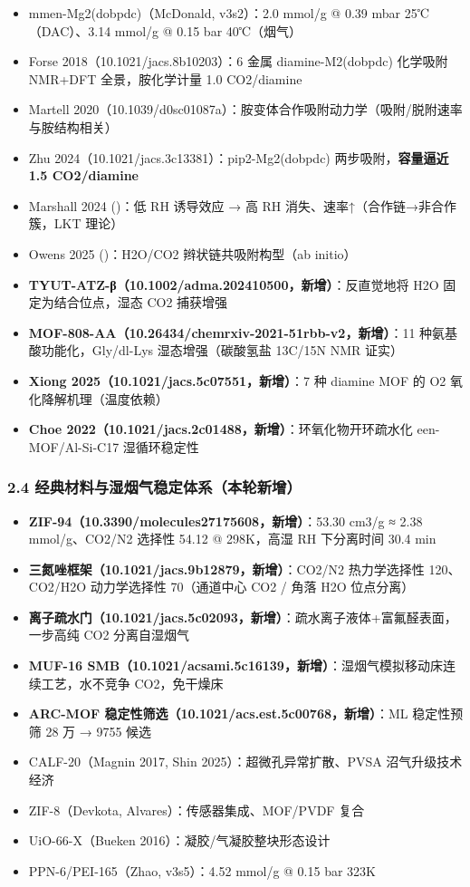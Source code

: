 \documentclass[12pt,a4paper]{ctexart}
\providecommand{\tightlist}{%
  \setlength{\itemsep}{0pt}\setlength{\parskip}{0pt}}
\begin{document}
\begin{itemize}
\tightlist
\item
  mmen-Mg2(dobpdc)（McDonald, v3s2）：2.0 mmol/g @ 0.39 mbar 25℃（DAC）、3.14 mmol/g @ 0.15 bar 40℃（烟气）
\item
  Forse 2018（10.1021/jacs.8b10203）：6 金属 diamine-M2(dobpdc) 化学吸附 NMR+DFT 全景，胺化学计量 1.0 CO2/diamine
\item
  Martell 2020（10.1039/d0sc01087a）：胺变体合作吸附动力学（吸附/脱附速率与胺结构相关）
\item
  Zhu 2024（10.1021/jacs.3c13381）：pip2-Mg2(dobpdc) 两步吸附，\textbf{容量逼近 1.5 CO2/diamine}
\item
  Marshall 2024 (\cite{p35})：低 RH 诱导效应 → 高 RH 消失、速率↑（合作链→非合作簇，LKT 理论）
\item
  Owens 2025 (\cite{p24})：H2O/CO2 辫状链共吸附构型（ab initio）
\item
  \textbf{TYUT-ATZ-β（10.1002/adma.202410500，新增）}：反直觉地将 H2O 固定为结合位点，湿态 CO2 捕获增强
\item
  \textbf{MOF-808-AA（10.26434/chemrxiv-2021-51rbb-v2，新增）}：11 种氨基酸功能化，Gly/dl-Lys 湿态增强（碳酸氢盐 13C/15N NMR 证实）
\item
  \textbf{Xiong 2025（10.1021/jacs.5c07551，新增）}：7 种 diamine MOF 的 O2 氧化降解机理（温度依赖）
\item
  \textbf{Choe 2022（10.1021/jacs.2c01488，新增）}：环氧化物开环疏水化 een-MOF/Al-Si-C17 湿循环稳定性
\end{itemize}

\subsubsection{2.4 经典材料与湿烟气稳定体系（本轮新增）}\label{ux7ecfux5178ux6750ux6599ux4e0eux6e7fux70dfux6c14ux7a33ux5b9aux4f53ux7cfbux672cux8f6eux65b0ux589e}

\begin{itemize}
\tightlist
\item
  \textbf{ZIF-94（10.3390/molecules27175608，新增）}：53.30 cm3/g ≈ 2.38 mmol/g、CO2/N2 选择性 54.12 @ 298K，高湿 RH 下分离时间 30.4 min
\item
  \textbf{三氮唑框架（10.1021/jacs.9b12879，新增）}：CO2/N2 热力学选择性 120、CO2/H2O 动力学选择性 70（通道中心 CO2 / 角落 H2O 位点分离）
\item
  \textbf{离子疏水门（10.1021/jacs.5c02093，新增）}：疏水离子液体+富氟醛表面，一步高纯 CO2 分离自湿烟气
\item
  \textbf{MUF-16 SMB（10.1021/acsami.5c16139，新增）}：湿烟气模拟移动床连续工艺，水不竞争 CO2，免干燥床
\item
  \textbf{ARC-MOF 稳定性筛选（10.1021/acs.est.5c00768，新增）}：ML 稳定性预筛 28 万 → 9755 候选
\item
  CALF-20（Magnin 2017, Shin 2025）：超微孔异常扩散、PVSA 沼气升级技术经济
\item
  ZIF-8（Devkota, Alvares）：传感器集成、MOF/PVDF 复合
\item
  UiO-66-X（Bueken 2016）：凝胶/气凝胶整块形态设计
\item
  PPN-6/PEI-165（Zhao, v3s5）：4.52 mmol/g @ 0.15 bar 323K
\end{itemize}
\end{document}
